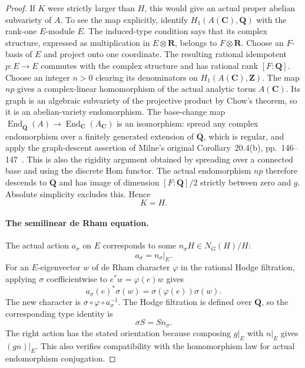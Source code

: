 \begin{proof}
If $K$ were strictly larger than $H$, this would give
an actual proper abelian subvariety of $A$. To see the
map explicitly, identify $H_1(A(\mathbf C),\mathbf Q)$
with the rank-one $E$-module $E$. The induced-type
condition says that its complex structure, expressed
as multiplication in $E\otimes\mathbf R$, belongs to
$F\otimes\mathbf R$. Choose an $F$-basis of $E$ and
project onto one coordinate. The resulting rational
idempotent $p:E\to E$ commutes with the complex
structure and has rational rank $[F:\mathbf Q]$.
Choose an integer $n>0$ clearing its denominators on
$H_1(A(\mathbf C),\mathbf Z)$. The map $np$ gives a
complex-linear homomorphism of the actual analytic
torus $A(\mathbf C)$. Its graph is an algebraic
subvariety of the projective product by Chow's theorem,
so it is an abelian-variety endomorphism. The base-change
map
$\operatorname{End}_{\overline{\mathbf Q}}(A)
 \to\operatorname{End}_{\mathbf C}(A_{\mathbf C})$
is an isomorphism: spread any complex endomorphism over
a finitely generated extension of $\overline{\mathbf Q}$,
which is regular, and apply the graph-descent assertion
of Milne's original Corollary~20.4(b), pp.~146--147~\cite{AuditMilne1986AV}.
This is also the rigidity argument obtained by spreading
over a connected base and using the discrete Hom functor.
The actual endomorphism $np$ therefore descends to
$\overline{\mathbf Q}$ and has image of dimension
$[F:\mathbf Q]/2$ strictly between zero and $g$.
Absolute simplicity excludes this. Hence
\[
                              K=H.                        \tag{CMQ.2}
\]

\paragraph{The semilinear de Rham equation.}
The actual action $a_\sigma$ on $E$ corresponds to
some $n_\sigma H\in N_G(H)/H$:
\[
                       a_\sigma=n_\sigma|_E.
\]
For an $E$-eigenvector $w$ of de Rham character
$\varphi$ in the rational Hodge filtration, applying
$\sigma$ coefficientwise to $e^*w=\varphi(e)w$ gives
\[
             a_\sigma(e)^*\sigma(w)
                    =\sigma(\varphi(e))\sigma(w).
\]
The new character is
$\sigma\circ\varphi\circ a_\sigma^{-1}$.
The Hodge filtration is defined over $\mathbf Q$,
so the corresponding type identity is
\[
                         \sigma S=S n_\sigma.             \tag{CMQ.3}
\]
The right action has the stated orientation because
composing $g|_E$ with $n|_E$ gives $(gn)|_E$.
This also verifies compatibility with the
homomorphism law for actual endomorphism conjugation.


\end{proof}
